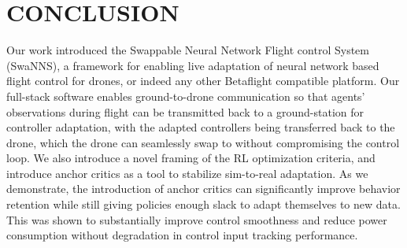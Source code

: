\documentclass[letterpaper, 10 pt, conference]{ieeeconf} %
\newcommand{\firmwarelong}{Swappable Neural Network Flight control}
\newcommand{\framework}{SwaNNS}
\begin{document}
    

\section{CONCLUSION}\label{sec:conclusion}
    
    Our work introduced the \firmwarelong{} System (\framework{}), a framework for enabling live adaptation of neural network based flight control for drones, or indeed any other Betaflight compatible platform.
    Our full-stack software enables ground-to-drone communication so that agents' observations during flight can be transmitted back to a ground-station for controller adaptation, with the adapted controllers being transferred back to the drone, which the drone can seamlessly swap to without compromising the control loop.
    We also introduce a novel framing of the RL optimization criteria, and introduce anchor critics as a tool to stabilize sim-to-real adaptation.
    As we demonstrate, the introduction of anchor critics can significantly improve behavior retention while still giving policies enough slack to adapt themselves to new data.
    This was shown to substantially improve control smoothness and reduce power consumption without degradation in control input tracking performance.





\end{document}

